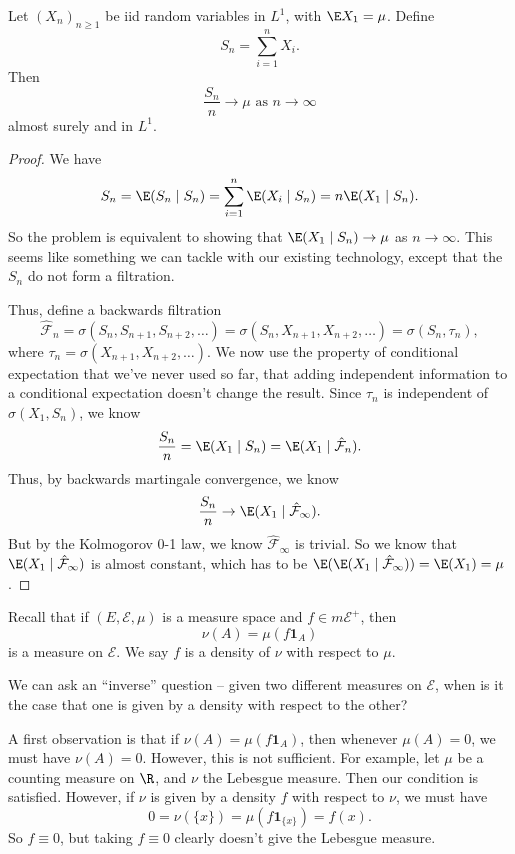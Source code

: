 \documentclass[a4paper]{article}
\begin{document}
\begin{thm}
  Let $(X_n)_{n \geq 1}$ be iid random variables in $L^1$, with $\E X_1 = \mu$. Define
  \[
    S_n = \sum_{i = 1}^n X_i.
  \]
  Then
  \[
    \frac{S_n}{n} \to \mu\text{ as }n \to \infty
  \]
  almost surely and in $L^1$.
\end{thm}

\begin{proof}
  We have
  \[
    S_n = \E(S_n \mid S_n) = \sum_{i = 1}^n \E(X_i \mid S_n) = n \E(X_1 \mid S_n).
  \]
  So the problem is equivalent to showing that $\E(X_1 \mid S_n) \to \mu$ as $n \to \infty$. This seems like something we can tackle with our existing technology, except that the $S_n$ do not form a filtration.

  Thus, define a backwards filtration
  \[
    \hat{\mathcal{F}}_n = \sigma(S_n, S_{n + 1}, S_{n + 2}, \ldots) = \sigma(S_n, X_{n + 1}, X_{n + 2}, \ldots) = \sigma(S_n, \tau_n),
  \]
  where $\tau_n = \sigma(X_{n + 1}, X_{n + 2}, \ldots)$. We now use the property of conditional expectation that we've never used so far, that adding independent information to a conditional expectation doesn't change the result. Since $\tau_n$ is independent of $\sigma(X_1, S_n)$, we know
  \[
    \frac{S_n}{n} = \E(X_1 \mid S_n) = \E(X_1 \mid \hat{\mathcal{F}}_n).
  \]
  Thus, by backwards martingale convergence, we know
  \[
    \frac{S_n}{n} \to \E(X_1 \mid \hat{\mathcal{F}}_{\infty}).
  \]
  But by the Kolmogorov 0-1 law, we know $\hat{\mathcal{F}}_{\infty}$ is trivial. So we know that $\E(X_1 \mid \hat{\mathcal{F}}_{\infty})$ is almost constant, which has to be $\E(\E(X_1 \mid \hat{\mathcal{F}}_{\infty})) = \E(X_1) = \mu$.
\end{proof}

Recall that if $(E, \mathcal{E}, \mu)$ is a measure space and $f \in m\mathcal{E}^+$, then
\[
  \nu(A) = \mu(f \mathbf{1}_A)
\]
is a measure on $\mathcal{E}$. We say $f$ is a density of $\nu$ with respect to $\mu$.

We can ask an ``inverse'' question -- given two different measures on $\mathcal{E}$, when is it the case that one is given by a density with respect to the other?

A first observation is that if $\nu(A) = \mu(f \mathbf{1}_A)$, then whenever $\mu(A) = 0$, we must have $\nu(A) = 0$. However, this is not sufficient. For example, let $\mu$ be a counting measure on $\R$, and $\nu$ the Lebesgue measure. Then our condition is satisfied. However, if $\nu$ is given by a density $f$ with respect to $\nu$, we must have
\[
  0 = \nu(\{x\}) = \mu(f \mathbf{1}_{\{x\}}) = f(x).
\]
So $f \equiv 0$, but taking $f \equiv 0$ clearly doesn't give the Lebesgue measure.
\end{document}
